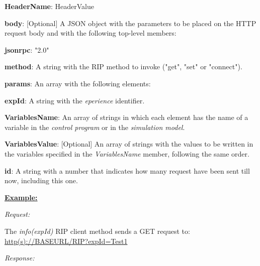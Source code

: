 \begin{myEnumerate}
\begin{myEnumerate}
\begin{myEnumerate}
\begin{myEnumerate}
                    \begin{myEnumerate}
                        \item \textbf{HeaderName}: HeaderValue
                    \end{myEnumerate}
                    \item \textbf{body}: [Optional] A JSON object with the parameters to be placed on the HTTP request body and with the following top-level members:
                    \begin{myEnumerate}
                        \item \textbf{jsonrpc}: "2.0"
                        \item \textbf{method}: A string with the RIP method to invoke ("get", "set" or "connect"). %
                        \item \textbf{params}: An array with the following elements:
                        \begin{myEnumerate}
                            \item \textbf{expId}: A string with the \textit{eperience} identifier.
                            \item \textbf{VariablesName}: An array of strings in which each element has the name of a variable in the \textit{control program} or in the \textit{simulation model}.
                            \item \textbf{VariablesValue}: [Optional] An array of strings with the values to be written in the variables specified in the \textit{VariablesName} member, following the same order.
                        \end{myEnumerate}
                        \item \textbf{id}: A string with a number that indicates how many request have been sent till now, including this one.
                    \end{myEnumerate}
            \end{myEnumerate}
        \end{myEnumerate}
    \end{myEnumerate}
\end{myEnumerate}

\textbf{\underline{Example:}}

\textit{Request:}

The \textit{info(expId)} RIP client method sends a GET request to: \url{http(s)://BASEURL/RIP?expId=Test1}

\textit{Response:}

